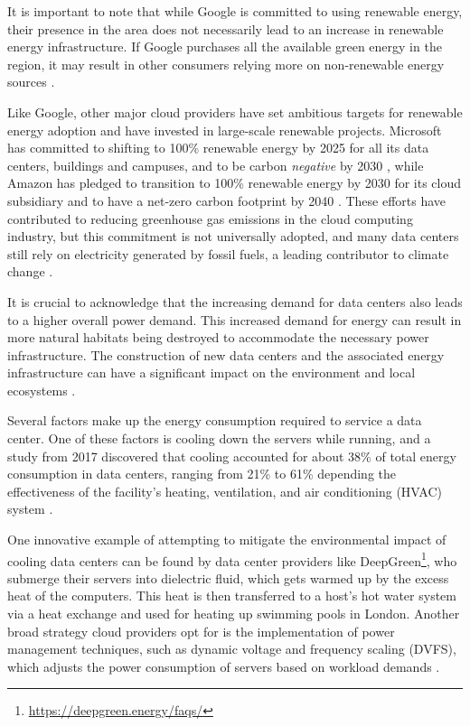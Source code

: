 \documentclass[
  table]{report}
\begin{document}
It is important to note that while Google is committed to using
renewable energy, their presence in the area does not necessarily lead
to an increase in renewable energy infrastructure. If Google purchases
all the available green energy in the region, it may result in other
consumers relying more on non-renewable energy sources
\citep{sundtConsumersWillingnessPay2015}.

Like Google, other major cloud providers have set ambitious targets for
renewable energy adoption and have invested in large-scale renewable
projects. Microsoft has committed to shifting to 100\% renewable energy
by 2025 for all its data centers, buildings and campuses, and to be
carbon \emph{negative} by 2030 \citep{smithMicrosoftWillBe2020}, while
Amazon has pledged to transition to 100\% renewable energy by 2030 for
its cloud subsidiary and to have a net-zero carbon footprint by 2040
\citep{amazonClimatePledge2019}. These efforts have contributed to
reducing greenhouse gas emissions in the cloud computing industry, but
this commitment is not universally adopted, and many data centers still
rely on electricity generated by fossil fuels, a leading contributor to
climate change \citep{mytton2020}.

It is crucial to acknowledge that the increasing demand for data centers
also leads to a higher overall power demand. This increased demand for
energy can result in more natural habitats being destroyed to
accommodate the necessary power infrastructure. The construction of new
data centers and the associated energy infrastructure can have a
significant impact on the environment and local ecosystems
\citep{bolognaDeforestationWorldPopulation2020}.

Several factors make up the energy consumption required to service a
data center. One of these factors is cooling down the servers while
running, and a study from 2017 discovered that cooling accounted for
about 38\% of total energy consumption in data centers, ranging from
21\% to 61\% depending the effectiveness of the facility's heating,
ventilation, and air conditioning (HVAC) system
\citep{niReviewAirConditioning2017}.

One innovative example of attempting to mitigate the environmental
impact of cooling data centers can be found by data center providers
like DeepGreen\footnote{\url{https://deepgreen.energy/faqs/}}, who
submerge their servers into dielectric fluid, which gets warmed up by
the excess heat of the computers. This heat is then transferred to a
host's hot water system via a heat exchange and used for heating up
swimming pools in London. Another broad strategy cloud providers opt for
is the implementation of power management techniques, such as dynamic
voltage and frequency scaling (DVFS), which adjusts the power
consumption of servers based on workload demands
\citep{beloglazovEnergyawareResourceAllocation2012}.
\end{document}
